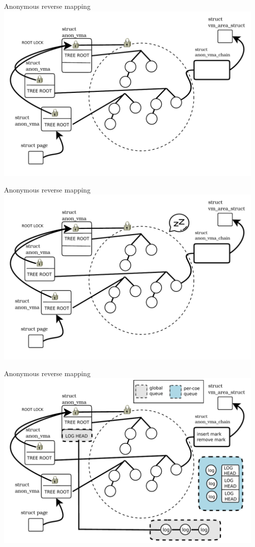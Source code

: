 \documentclass[english]{beamer} %
\begin{document}
\begin{frame}{Anonymous reverse mapping}
\includegraphics[scale=0.5]{fig/anon_vma_default}
\end{frame}


\begin{frame}{Anonymous reverse mapping}
\includegraphics[scale=0.5]{fig/anon_vma_default_1}
\end{frame}


\begin{frame}{Anonymous reverse mapping}
\includegraphics[scale=0.5]{fig/anon_vma}
\end{frame}
\end{document}

